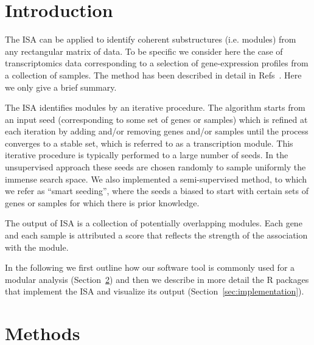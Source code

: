 \documentclass{bioinfo}
\begin{document}
\section{Introduction}

The ISA can be applied to identify coherent substructures (i.e. modules)
from any rectangular matrix of data. To be specific we consider here the
case of transcriptomics data corresponding to a selection of gene-expression
profiles from a collection of samples. The method has been described in
detail in Refs~\cite{isamod,isa}. Here we only give a brief summary.

The ISA identifies modules by an iterative procedure. The algorithm starts
from an input seed (corresponding to some set of genes or samples) which is
refined at each iteration by adding and/or removing genes and/or samples
until the process converges to a stable set, which is referred to as a
transcription module. This iterative procedure is typically performed to a
large number of seeds. In the unsupervised approach these seeds are chosen
randomly to sample uniformly the immense search space. We also implemented a
semi-supervised method, to which we refer as ``smart seeding'', where the
seeds a biased to start with certain sets of genes or samples for which
there is prior knowledge.

The output of ISA is a collection of potentially overlapping modules. Each
gene and each sample is attributed a score that reflects the strength of the
association with the module.

In the following we first outline how our software tool is commonly used for a
modular analysis (Section~\ref{sec:methods}) and then we describe in more
detail the R packages that implement the ISA and visualize its output
(Section~\ref{sec:implementation}).

\section{Methods}%
\label{sec:methods}
\end{document}
